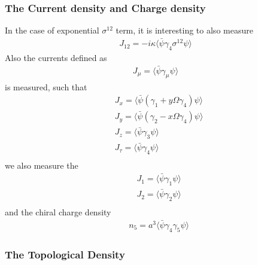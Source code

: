 \subsubsection{\label{sec:RotatingCurrentDensityChargeDensity}The Current density and Charge density}

In the case of exponential $\sigma ^{12}$ term, it is interesting to also measure
\begin{equation}
\begin{split}
J_{12}=-i\kappa \langle \bar{\psi} \gamma _4 \sigma ^{12} \psi \rangle
\end{split}
\end{equation}
Also the currents defined as
\begin{equation}
\begin{split}
J_{\mu}=\langle \bar{\psi} \gamma _{\mu} \psi \rangle
\end{split}
\end{equation}
is measured, such that
\begin{equation}
\begin{split}
&J_x=\langle \bar{\psi} (\gamma _1+y\Omega \gamma _4) \psi \rangle\\
&J_y=\langle \bar{\psi} (\gamma _2-x\Omega \gamma _4) \psi \rangle\\
&J_z=\langle \bar{\psi} \gamma _3 \psi \rangle\\
&J_{\tau}=\langle \bar{\psi} \gamma _4 \psi \rangle\\
\end{split}
\end{equation}
we also measure the
\begin{equation}
\begin{split}
&J_1=\langle \bar{\psi} \gamma _1 \psi \rangle\\
&J_2=\langle \bar{\psi} \gamma _2 \psi \rangle\\
\end{split}
\end{equation}
and the chiral charge density
\begin{equation}
\begin{split}
&n_5=a^3\langle \bar{\psi} \gamma _4\gamma _5\psi \rangle
\end{split}
\end{equation}

\subsubsection{\label{sec:RotatingTopologicalDensity}The Topological Density}

